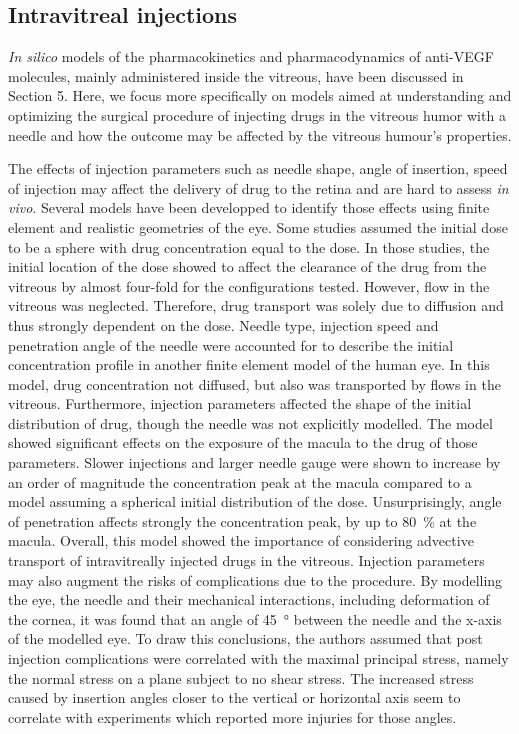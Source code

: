 \documentclass[12pt,a4paper]{journal}
\begin{document}
\subsection*{Intravitreal injections}

\textit{In silico} models of the pharmacokinetics and pharmacodynamics of anti-VEGF molecules, mainly administered inside the vitreous, have been discussed in Section 5.
Here, we focus more specifically on models aimed at understanding and optimizing the surgical procedure of injecting drugs in the vitreous humor with a needle and how the outcome may be affected by the vitreous humour's properties.

The effects of injection parameters such as needle shape, angle of insertion, speed of injection may affect the delivery of drug to the retina and are hard to assess \textit{in vivo}.
Several models have been developped to identify those effects using finite element and realistic geometries of the eye.
Some studies assumed the initial dose to be a sphere with drug concentration equal to the dose.\cite{Friedrich_1997,Friedrich_1997a}
In those studies, the initial location of the dose showed to affect the clearance of the drug from the vitreous by almost four-fold for the configurations tested.\cite{Friedrich_1997}
However, flow in the vitreous was neglected.
Therefore, drug transport was solely due to diffusion and thus strongly dependent on the dose.\cite{Friedrich_1997}
Needle type, injection speed and penetration angle of the needle were accounted for to describe the initial concentration profile in another finite element model of the human eye.\cite{Jooybar_2014}
In this model, drug concentration not diffused, but also was transported by flows in the vitreous.
Furthermore, injection parameters affected the shape of the initial distribution of drug, though the needle was not explicitly modelled.
The model showed significant effects on the exposure of the macula to the drug of those parameters.
Slower injections and larger needle gauge were shown to increase by an order of magnitude the concentration peak at the macula compared to a model assuming a spherical initial distribution of the dose.
Unsurprisingly, angle of penetration affects strongly the concentration peak, by up to \SI{80}{\percent} at the macula.\cite{Jooybar_2014}
Overall, this model showed the importance of considering advective transport of intravitreally injected drugs in the vitreous. 
Injection parameters may also augment the risks of complications due to the procedure.
By modelling the eye, the needle and their mechanical interactions, including deformation of the cornea, it was found that an angle of \SI{45}{\degree} between the needle and the x-axis of the modelled eye.\cite{Karimi_2018}
To draw this conclusions, the authors assumed that post injection complications were correlated with the maximal principal stress, namely the normal stress on a plane subject to no shear stress.  
The increased stress caused by insertion angles closer to the vertical or horizontal axis seem to correlate with experiments which reported more injuries for those angles.\cite{Karimi_2018}
\end{document}

